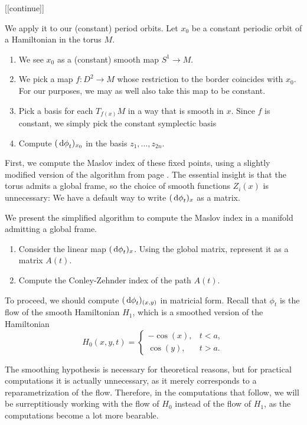 [[continue]]

We apply it to our (constant) period orbits. Let $x_0$ be a constant periodic orbit of a Hamiltonian in the torus $M$.
\begin{enumerate}[algorithm]
\item We see $x_0$ as a (constant) smooth map $S^1 \to M$.
\item We pick a map $f \colon D^2 \to M$ whose restriction to the border coincides with $x_0$. For our purposes, we may as well also take this map to be constant.
\item Pick a basis for each $T_{f(x)} M$ in a way that is smooth in $x$. Since $f$ is constant, we simply pick the constant symplectic basis
\item Compute $(\dl \phi_t)_{x_0}$ in the basis $z_1, \dots, z_{2n}$.
\end{enumerate}

First, we compute the Maslov index of these fixed points, using a slightly modified version of the algorithm from page \pageref{page:maslovalg}. The essential insight is that the torus admits a global frame, so the choice of smooth functions $Z_i(x)$ is unnecessary: We have a default way to write $(\dl \phi_t)_x$ as a matrix.

We present the simplified algorithm to compute the Maslov index in a manifold admitting a global frame.
\begin{enumerate}[algorithm]\label{page:maslovalg2}
\item Consider the linear map $(\dl \phi_t)_x$. Using the global matrix, represent it as a matrix $A(t)$.
\item Compute the Conley-Zehnder index of the path $A(t)$.
\end{enumerate}

To proceed, we should compute $(\dl \phi_t)_{(x,y)}$ in matricial form. Recall that $\phi_t$ is the flow of the smooth Hamiltonian $H_1$, which is a smoothed version of the Hamiltonian
\begin{equation}
H_0(x,y,t) = \begin{cases}
-\cos(x), & t < a,\\
\cos(y), & t > a.
\end{cases}
\end{equation}

The smoothing hypothesis is necessary for theoretical reasons, but for practical computations it is actually unnecessary, as it merely corresponds to a reparametrization of the flow. Therefore, in the computations that follow, we will be surreptitiously working with the flow of $H_0$ instead of the flow of $H_1$, as the computations become a lot more bearable.

